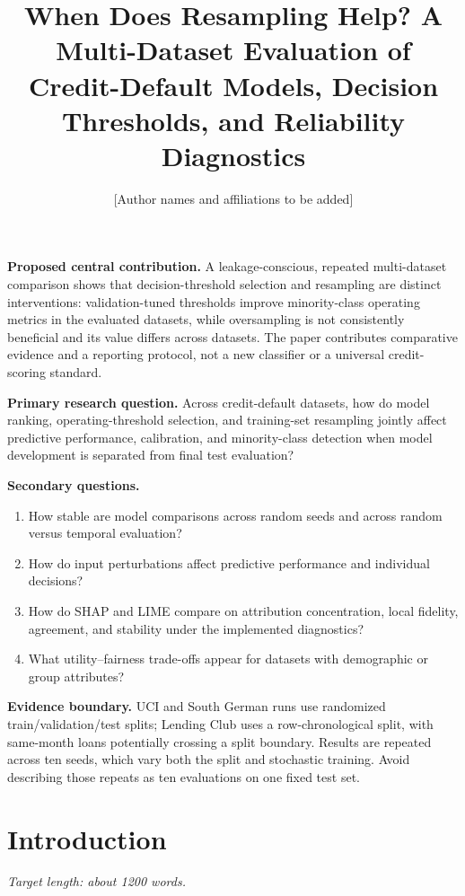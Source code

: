 \documentclass[pdflatex,sn-mathphys-num]{sn-jnl}
\title[Thresholds, resampling, and credit-default evaluation]{
When Does Resampling Help? A Multi-Dataset Evaluation of Credit-Default Models,
Decision Thresholds, and Reliability Diagnostics
}
\author{[Author names and affiliations to be added]}
\date{}
\begin{document}
\maketitle

\noindent\textbf{Proposed central contribution.} A leakage-conscious, repeated multi-dataset comparison shows that decision-threshold selection and resampling are distinct interventions: validation-tuned thresholds improve minority-class operating metrics in the evaluated datasets, while oversampling is not consistently beneficial and its value differs across datasets. The paper contributes comparative evidence and a reporting protocol, not a new classifier or a universal credit-scoring standard.

\noindent\textbf{Primary research question.} Across credit-default datasets, how do model ranking, operating-threshold selection, and training-set resampling jointly affect predictive performance, calibration, and minority-class detection when model development is separated from final test evaluation?

\noindent\textbf{Secondary questions.}
\begin{enumerate}
  \item How stable are model comparisons across random seeds and across random versus temporal evaluation?
  \item How do input perturbations affect predictive performance and individual decisions?
  \item How do SHAP and LIME compare on attribution concentration, local fidelity, agreement, and stability under the implemented diagnostics?
  \item What utility--fairness trade-offs appear for datasets with demographic or group attributes?
\end{enumerate}

\noindent\textbf{Evidence boundary.} UCI and South German runs use randomized train/validation/test splits; Lending Club uses a row-chronological split, with same-month loans potentially crossing a split boundary. Results are repeated across ten seeds, which vary both the split and stochastic training. Avoid describing those repeats as ten evaluations on one fixed test set.

\section{Introduction}
\textit{Target length: about 1200 words.}
\end{document}
